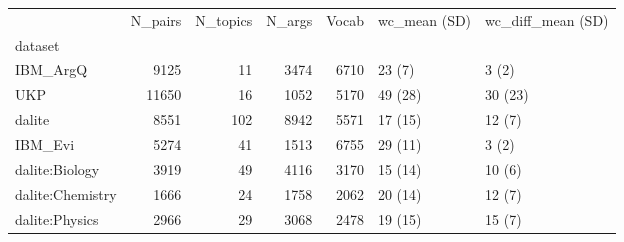 \begin{tabular}{lrrrrll}
\toprule
{} &  N\_pairs &  N\_topics &  N\_args &  Vocab & wc\_mean (SD) & wc\_diff\_mean (SD) \\
dataset          &          &           &         &        &              &                   \\
\midrule
IBM\_ArgQ         &     9125 &        11 &    3474 &   6710 &       23 (7) &             3 (2) \\
UKP              &    11650 &        16 &    1052 &   5170 &      49 (28) &           30 (23) \\
dalite           &     8551 &       102 &    8942 &   5571 &      17 (15) &            12 (7) \\
IBM\_Evi          &     5274 &        41 &    1513 &   6755 &      29 (11) &             3 (2) \\
dalite:Biology   &     3919 &        49 &    4116 &   3170 &      15 (14) &            10 (6) \\
dalite:Chemistry &     1666 &        24 &    1758 &   2062 &      20 (14) &            12 (7) \\
dalite:Physics   &     2966 &        29 &    3068 &   2478 &      19 (15) &            15 (7) \\
\bottomrule
\end{tabular}
